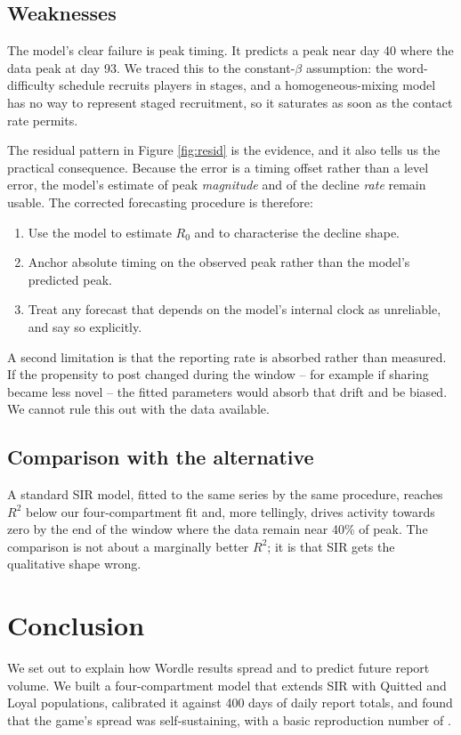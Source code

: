 \documentclass[12pt]{article}
\begin{document}
\subsection{Weaknesses}

The model's clear failure is peak timing. It predicts a peak near day 40 where
the data peak at day 93. We traced this to the constant-$\beta$ assumption: the
word-difficulty schedule recruits players in stages, and a homogeneous-mixing
model has no way to represent staged recruitment, so it saturates as soon as
the contact rate permits.

The residual pattern in Figure \ref{fig:resid} is the evidence, and it also
tells us the practical consequence. Because the error is a timing offset rather
than a level error, the model's estimate of peak \emph{magnitude} and of the
decline \emph{rate} remain usable. The corrected forecasting procedure is
therefore:

\begin{enumerate}
  \item Use the model to estimate $R_0$ and to characterise the decline shape.
  \item Anchor absolute timing on the observed peak rather than the model's
        predicted peak.
  \item Treat any forecast that depends on the model's internal clock as
        unreliable, and say so explicitly.
\end{enumerate}

A second limitation is that the reporting rate is absorbed rather than
measured. If the propensity to post changed during the window -- for example if
sharing became less novel -- the fitted parameters would absorb that drift and
be biased. We cannot rule this out with the data available.

\subsection{Comparison with the alternative}

A standard SIR model, fitted to the same series by the same procedure, reaches
$R^{2}$ below our four-compartment fit and, more tellingly, drives activity
towards zero by the end of the window where the data remain near 40\% of peak.
The comparison is not about a marginally better $R^{2}$; it is that SIR gets the
qualitative shape wrong.

\section{Conclusion}\label{sec:SEC-080}
We set out to explain how Wordle results spread and to predict future report
volume. We built a four-compartment model that extends SIR with Quitted and
Loyal populations, calibrated it against 400 days of daily report totals, and
found that the game's spread was self-sustaining, with a basic reproduction
number of 
\numRZero{}.
\end{document}
